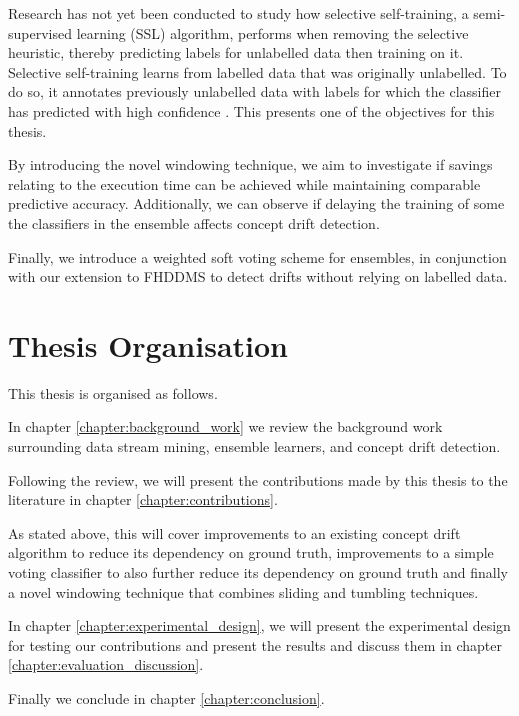 Research has not yet been conducted to study how selective self-training, a semi-supervised learning (SSL) algorithm, performs when removing the selective heuristic, thereby predicting labels for unlabelled data then training on it. Selective self-training learns from labelled data that was originally unlabelled. To do so, it annotates previously unlabelled data with labels for which the classifier has predicted with high confidence \cite{zhu2009selftraining}. This presents one of the objectives for this thesis.

By introducing the novel windowing technique, we aim to investigate if savings relating to the execution time can be achieved while maintaining comparable predictive accuracy. Additionally, we can observe if delaying the training of some the classifiers in the ensemble affects concept drift detection.

Finally, we introduce a weighted soft voting scheme for ensembles, in conjunction with our extension to FHDDMS to detect drifts without relying on labelled data.


\section{Thesis Organisation}
This thesis is organised as follows.

In chapter \ref{chapter:background_work} we review the background work surrounding data stream mining, ensemble learners, and concept drift detection.

Following the review, we will present the contributions made by this thesis to the literature in chapter \ref{chapter:contributions}.

As stated above, this will cover improvements to an existing concept drift algorithm to reduce its dependency on ground truth, improvements to a simple voting classifier to also further reduce its dependency on ground truth and finally a novel windowing technique that combines sliding and tumbling techniques.

In chapter \ref{chapter:experimental_design}, we will present the experimental design for testing our contributions and present the results and discuss them in chapter \ref{chapter:evaluation_discussion}.

Finally we conclude in chapter \ref{chapter:conclusion}.
